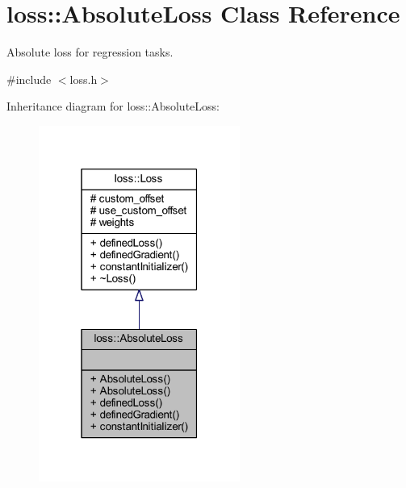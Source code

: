 \hypertarget{classloss_1_1_absolute_loss}{}\section{loss\+:\+:Absolute\+Loss Class Reference}
\label{classloss_1_1_absolute_loss}


Absolute loss for regression tasks.  




{\ttfamily \#include $<$loss.\+h$>$}



Inheritance diagram for loss\+:\+:Absolute\+Loss\+:\nopagebreak
\begin{figure}[H]
\begin{center}
\leavevmode
\includegraphics[width=187pt]{classloss_1_1_absolute_loss__inherit__graph}
\end{center}
\end{figure}


